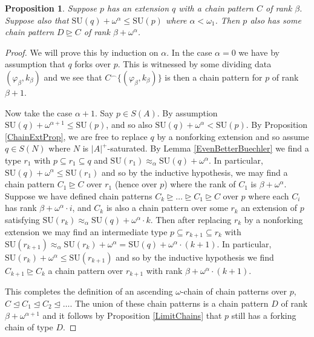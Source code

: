 \documentclass{article}
\newtheorem{prop}[theorem]{Proposition}
\theoremstyle{remark}
\theoremstyle{definition}
\begin{document}
\begin{prop}\label{IntermediateProp}
    Suppose $p$ has an extension $q$ with a chain pattern $C$ of rank $\beta$. Suppose also that $\mathrm{SU}(q)+\omega^\alpha\leq \mathrm{SU}(p)$ where $\alpha<\omega_1$. Then $p$ also has some chain pattern $D\trianglerighteq C$ of rank $\beta+\omega^\alpha$.
\end{prop}
\begin{proof}
    We will prove this by induction on $\alpha$. In the case $\alpha=0$ we have by assumption that $q$ forks over $p$. This is witnessed by some dividing data $(\varphi_\beta, k_\beta)$ and we see that $C^\frown \{(\varphi_\beta, k_\beta)\}$ is then a chain pattern for $p$ of rank $\beta+1$.

    Now take the case $\alpha+1$. Say $p\in S(A)$. By assumption $\mathrm{SU}(q)+\omega^{\alpha+1}\leq\mathrm{SU}(p)$, and so also $\mathrm{SU}(q)+\omega^\alpha<\mathrm{SU}(p)$. By Proposition \ref{ChainExtProp}, we are free to replace $q$ by a nonforking extension and so assume $q\in S(N)$ where $N$ is $|A|^+$-saturated. By Lemma \ref{EvenBetterBuechler} we find a type $r_1$ with $p\subseteq r_1\subseteq q$ and $\mathrm{SU}(r_1)\approx_\alpha\mathrm{SU}(q)+\omega^\alpha$. In particular, $\mathrm{SU}(q)+\omega^\alpha\leq \mathrm{SU}(r_1)$ and so by the inductive hypothesis, we may find a chain pattern $C_1\trianglerighteq C$ over $r_1$ (hence over $p$) where the rank of $C_1$ is $\beta+\omega^\alpha$. Suppose we have defined chain patterns $C_k\trianglerighteq\dots\trianglerighteq C_1\trianglerighteq C$ over $p$ where each $C_i$ has rank $\beta+\omega^\alpha\cdot i$, and $C_k$ is also a chain pattern over some $r_k$ an extension of $p$ satisfying $\mathrm{SU}(r_k)\approx_\alpha\mathrm{SU}(q)+\omega^\alpha\cdot k$. Then after replacing $r_k$ by a nonforking extension we may find an intermediate type $p\subseteq r_{k+1}\subseteq r_k$ with $\mathrm{SU}(r_{k+1})\approx_\alpha\mathrm{SU}(r_k)+\omega^\alpha=\mathrm{SU}(q)+\omega^\alpha\cdot(k+1)$. In particular, $\mathrm{SU}(r_k)+\omega^\alpha\leq \mathrm{SU}(r_{k+1})$ and so by the inductive hypothesis we find $C_{k+1}\trianglerighteq C_{k}$ a chain pattern over $r_{k+1}$ with rank $\beta+\omega^\alpha\cdot(k+1)$.

    This completes the definition of an ascending $\omega$-chain of chain patterns over $p$, $C\trianglelefteq C_{1}\trianglelefteq C_2\trianglelefteq\dots$. The union of these chain patterns is a chain pattern $D$ of rank $\beta+\omega^{\alpha+1}$ and it follows by Proposition \ref{LimitChains} that $p$ still has a forking chain of type $D$. 


\end{proof}
\end{document}
